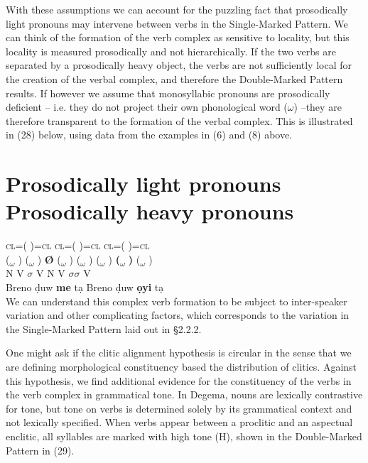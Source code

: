 \documentclass[output=paper]{langsci/langscibook}
\begin{document}
With these assumptions we can account for the puzzling fact that prosodically light pronouns may intervene between verbs in the Single-Marked Pattern. We can think of the formation of the verb complex as sensitive to locality, but this locality is measured prosodically and not hierarchically. If the two verbs are separated by a prosodically heavy object, the verbs are not sufficiently local for the creation of the verbal complex, and therefore the Double-Marked Pattern results. If however we assume that monosyllabic pronouns are prosodically deficient – i.e. they do not project their own phonological word ($\omega $) –they are therefore transparent to the formation of the verbal complex. This is illustrated in (28) below, using data from the examples in (6) and (8) above. 

\chapter[Prosodically light pronouns         Prosodically heavy pronouns]{Prosodically light pronouns         Prosodically heavy pronouns}
\label{bkm:Ref449531282}              \textsc{cl}=(\textsubscript{  }        )=\textsc{cl    }         \textsc{cl}=(\textsubscript{  })=\textsc{cl   cl}=(  )=\textsc{cl}\\
     (\textsubscript{$\omega $}     )    (\textsubscript{$\omega $}   ) \textbf{ Ø}   (\textsubscript{$\omega $}  )       (\textsubscript{$\omega $}    )        (\textsubscript{$\omega $}  )   \textbf{(}\textbf{\textsubscript{$\omega $}}\textbf{  )}  (\textsubscript{$\omega $}  )\\
     N      V  \textbf{  $\sigma $}   V         N      V    \textbf{$\sigma \sigma $}    V\\
\gll   Breno    ḍuw  \textbf{me}   tạ         Breno    ḍuw    \textbf{ọyi}    tạ\\
We can understand this complex verb formation to be subject to inter-speaker variation and other complicating factors, which corresponds to the variation in the Single-Marked Pattern laid out in §2.2.2.

One might ask if the clitic alignment hypothesis is circular in the sense that we are defining morphological constituency based the distribution of clitics. Against this hypothesis, we find additional evidence for the constituency of the verbs in the verb complex in grammatical tone. In Degema, nouns are lexically contrastive for tone, but tone on verbs is determined solely by its grammatical context and not lexically specified. When verbs appear between a proclitic and an aspectual enclitic, all syllables are marked with high tone (H), shown in the Double-Marked Pattern in (29).
\end{document}
